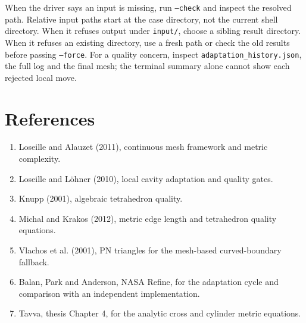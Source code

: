 \documentclass[11pt,a4paper]{article}
\begin{document}
When the driver says an input is missing, run \texttt{--check} and inspect the resolved path. Relative input paths start at the case directory, not the current shell directory. When it refuses output under \texttt{input/}, choose a sibling result directory. When it refuses an existing directory, use a fresh path or check the old results before passing \texttt{--force}. For a quality concern, inspect \texttt{adaptation\_history.json}, the full log and the final mesh; the terminal summary alone cannot show each rejected local move.

\clearpage
\section{References}
\begin{enumerate}[leftmargin=*]
\item Loseille and Alauzet (2011), continuous mesh framework and metric complexity.
\item Loseille and L\"ohner (2010), local cavity adaptation and quality gates.
\item Knupp (2001), algebraic tetrahedron quality.
\item Michal and Krakos (2012), metric edge length and tetrahedron quality equations.
\item Vlachos et al. (2001), PN triangles for the mesh-based curved-boundary fallback.
\item Balan, Park and Anderson, NASA Refine, for the adaptation cycle and comparison with an independent implementation.
\item Tavva, thesis Chapter 4, for the analytic cross and cylinder metric equations.
\end{enumerate}
\end{document}
